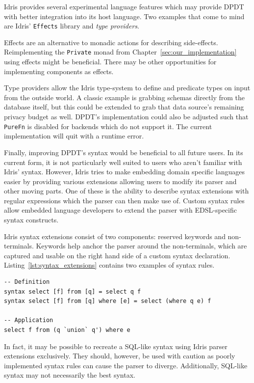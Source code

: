 \documentclass[12pt]{report}
\begin{document}

Idris provides several experimental language features which may provide DPDT with better integration into its host language.
Two examples that come to mind are Idris' \texttt{Effects} library and \textit{type providers}.

Effects are an alternative to monadic actions for describing side-effects.
Reimplementing the \texttt{Private} monad from Chapter~\ref{sec:our_implementation} using effects might be beneficial.
There may be other opportunities for implementing components as effects.

Type providers allow the Idris type-system to define and predicate types on input from the outside world.
A classic example is grabbing schemas directly from the database itself, but this could be extended to grab that data source's remaining privacy budget as well.
DPDT's implementation could also be adjusted such that \texttt{PureFn} is disabled for backends which do not support it.
The current implementation will quit with a runtime error.


Finally, improving DPDT's syntax would be beneficial to all future users.
In its current form, it is not particularly well suited to users who aren't familiar with Idris' syntax.
However, Idris tries to make embedding domain specific languages easier by providing various extensions allowing users to modify its parser and other moving parts.
One of these is the ability to describe syntax extensions with regular expressions which the parser can then make use of.
Custom syntax rules allow embedded language developers to extend the parser with EDSL-specific syntax constructs.

Idris syntax extensions consist of two components: reserved keywords and non-terminals.
Keywords help anchor the parser around the non-terminals, which are captured and usable on the right hand side of a custom syntax declaration.
Listing~\ref{lst:syntax_extensions} contains two examples of syntax rules.

\begin{lstlisting}[caption={Extending Idris' syntax},label={lst:syntax_extensions}]
-- Definition
syntax select [f] from [q] = select q f
syntax select [f] from [q] where [e] = select (where q e) f

-- Application
select f from (q `union` q') where e
\end{lstlisting}

In fact, it may be possible to recreate a SQL-like syntax using Idris parser extensions exclusively.
They should, however, be used with caution as poorly implemented syntax rules can cause the parser to diverge.
Additionally, SQL-like syntax may not necessarily the best syntax.
\end{document}
